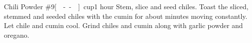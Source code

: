 \begin{recipe}{Chili Powder \#9}{\unit[--]{cup}}{1 hour}
Stem, slice and seed chiles.
Toast the sliced, stemmed and seeded chiles with the cumin for about \unit[3--4]{minutes} moving constantly.  Let chile and cumin cool.
Grind chiles and cumin along with garlic powder and oregano.
\end{recipe}
